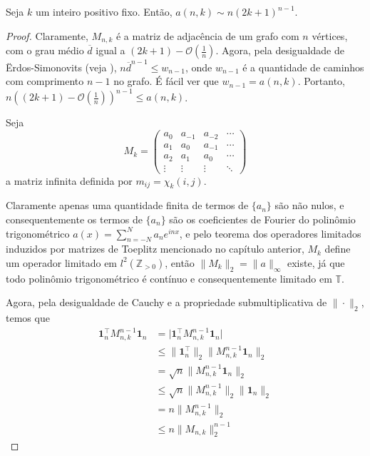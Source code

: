 \begin{theorem} \label{th:asymptotic} Seja $k$ um inteiro positivo fixo. Então, $a(n, k) \sim n(2k+1)^{n-1}$. \end{theorem} \begin{proof} Claramente, $M_{n,k}$ é a matriz de adjacência de um grafo com $n$ vértices, com o grau médio $\overline{d}$ igual a $(2k + 1) - \mathcal{O}(\frac{1}{n})$. Agora, pela desigualdade de Ërdos-Simonovits (veja \cite{erdossimonovits}), $n \overline{d}^{n-1} \le w_{n-1}$, onde $w_{n-1}$ é a quantidade de caminhos com comprimento $n-1$ no grafo. É fácil ver que $w_{n-1} = a(n, k)$. Portanto, $n ((2k + 1) - \mathcal{O}(\frac{1}{n}))^{n-1} \le a(n, k)$.

  Seja \[M_k = \begin{pmatrix} a_{0} & a_{-1} & a_{-2} & \cdots \\ a_{1} & a_{0} & a_{-1} & \cdots \\ a_2 & a_{1} & a_{0} & \cdots \\ \vdots & \vdots & \vdots & \ddots \end{pmatrix}\] a matriz infinita definida por $m_{ij} = \chi_k(i, j)$.

  Claramente apenas uma quantidade finita de termos de $\{a_n\}$ são não nulos, e consequentemente os termos de $\{ a_n \}$ são os coeficientes de Fourier do polinômio trigonométrico $a(x) = \sum_{n = -N}^N a_n e^{i n x}$, e pelo teorema dos operadores limitados induzidos por matrizes de Toeplitz mencionado no capítulo anterior, $M_k$ define um operador limitado em $l^2(\mathbb{Z}_{> 0})$, então $\|M_k\|_2 = \| a \|_{\infty}$ existe, já que todo polinômio trigonométrico é contínuo e consequentemente limitado em $\mathbb{T}$.

  Agora, pela desigualdade de Cauchy e a propriedade submultiplicativa de $\| \cdot \|_2$, temos que
  \begin{align*}
    \mathbf{1}_n^\intercal M_{n,k}^{n-1} \mathbf{1}_n & = \lvert \mathbf{1}_n^\intercal M_{n,k}^{n-1} \mathbf{1}_n\rvert      \\
                                                      & \le \| \mathbf{1}_n^\intercal \|_2 \| M_{n,k}^{n-1} \mathbf{1}_n \|_2 \\
                                                      & = \sqrt{n} \| M_{n,k}^{n-1} \mathbf{1}_n \|_2                         \\
                                                      & \le \sqrt{n} \| M_{n,k}^{n-1} \|_2 \| \mathbf{1}_n \|_2               \\
                                                      & = n \| M_{n,k}^{n-1} \|_2                                             \\
                                                      & \le n \| M_{n,k} \|_2^{n-1}
  \end{align*}


\end{proof}
